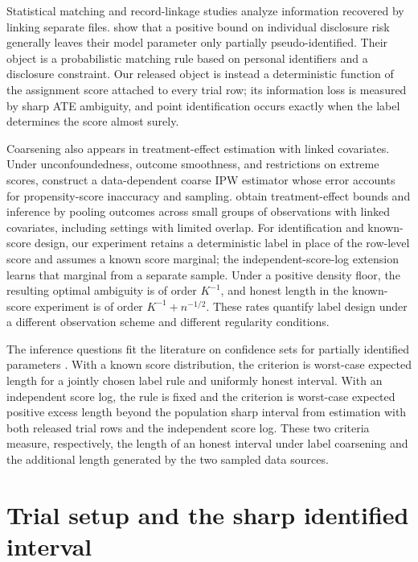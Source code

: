 \documentclass[11pt]{article}
\begin{document}
Statistical matching and record-linkage studies analyze information recovered by linking separate files.  show that a positive bound on individual disclosure risk generally leaves their model parameter only partially pseudo-identified. Their object is a probabilistic matching rule based on personal identifiers and a disclosure constraint. Our released object is instead a deterministic function of the assignment score attached to every trial row; its information loss is measured by sharp ATE ambiguity, and point identification occurs exactly when the label determines the score almost surely.

Coarsening also appears in treatment-effect estimation with linked covariates. Under unconfoundedness, outcome smoothness, and restrictions on extreme scores, \citet[Assumptions 1--3 and Informal Theorem 1.1]{KalavasisMehrotraZampetakis2024} construct a data-dependent coarse IPW estimator whose error accounts for propensity-score inaccuracy and sampling.  obtain treatment-effect bounds and inference by pooling outcomes across small groups of observations with linked covariates, including settings with limited overlap. For identification and known-score design, our experiment retains a deterministic label in place of the row-level score and assumes a known score marginal; the independent-score-log extension learns that marginal from a separate sample. Under a positive density floor, the resulting optimal ambiguity is of order \(K^{-1}\), and honest length in the known-score experiment is of order \(K^{-1}+n^{-1/2}\). These rates quantify label design under a different observation scheme and different regularity conditions.

The inference questions fit the literature on confidence sets for partially identified parameters \citep{ImbensManski2004,Stoye2009,ChernozhukovHongTamer2007,KaidoMolinariStoye2019}. With a known score distribution, the criterion is worst-case expected length for a jointly chosen label rule and uniformly honest interval. With an independent score log, the rule is fixed and the criterion is worst-case expected positive excess length beyond the population sharp interval from estimation with both released trial rows and the independent score log. These two criteria measure, respectively, the length of an honest interval under label coarsening and the additional length generated by the two sampled data sources.


\section{Trial setup and the sharp identified interval}
\end{document}

